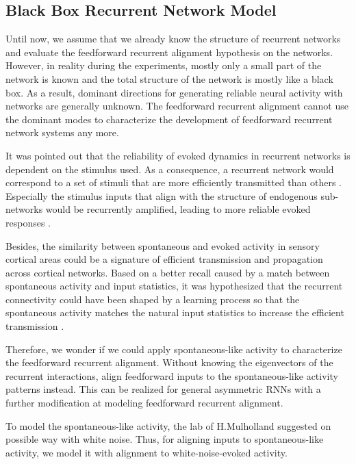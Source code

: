 \documentclass[11pt]{article}
\begin{document}
{	\clearpage
	\subsection{Black Box Recurrent Network Model}
	Until now, we assume that we already know the structure of recurrent networks and evaluate the feedforward recurrent alignment hypothesis on the networks. However, in reality during the experiments, mostly only a small part of the network is known and the total structure of the network is mostly like a black box. As a result, dominant directions for generating reliable neural activity with networks are generally unknown. The feedforward recurrent alignment cannot use the dominant modes to characterize the development of feedforward recurrent network systems any more. 
	
	It was pointed out that the reliability of evoked dynamics in recurrent networks is dependent on the stimulus used. As a consequence, a recurrent network would correspond to a set of stimuli that are more efficiently transmitted than others \cite{marre2009reliable}. 
	Especially the stimulus inputs that align with the structure of endogenous sub-networks would be recurrently amplified, leading to more reliable evoked responses \cite{mulholland2023selective}. 
	
	Besides, the similarity between spontaneous and evoked activity in sensory cortical areas could be a signature of efficient transmission and propagation across cortical networks. Based on a better recall caused by a match between spontaneous activity and input statistics, it was hypothesized that the recurrent connectivity could have been shaped by a learning process so that the spontaneous activity matches the natural input statistics to increase the efficient transmission \cite{marre2009reliable}. 
	
	Therefore, we wonder if we could apply spontaneous-like activity to characterize the feedforward recurrent alignment. Without knowing the eigenvectors of the recurrent interactions, align feedforward inputs to the spontaneous-like activity patterns instead. This can be realized for general asymmetric RNNs with a further modification at modeling feedforward recurrent alignment. 
	
	To model the spontaneous-like activity, the lab of H.Mulholland \cite{cosyne2023} suggested on possible way with white noise. Thus, for aligning inputs to spontaneous-like activity, we model it with alignment to white-noise-evoked activity.  
	
}
\end{document}
